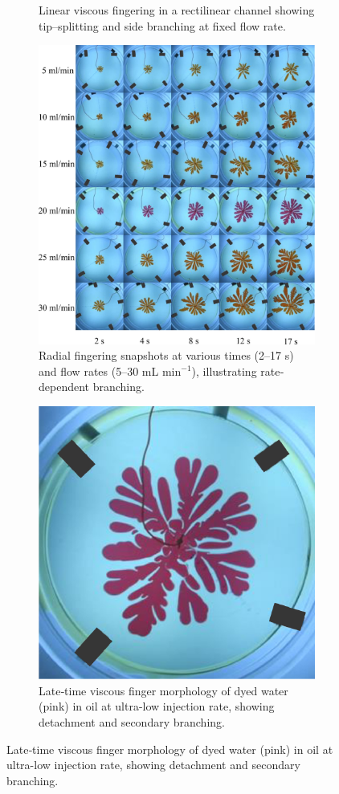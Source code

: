 \documentclass[12pt,a4paper]{article}
\begin{document}
\begin{figure}[H]
\begin{subfigure}{0.45\linewidth}
    \caption{Linear viscous fingering in a rectilinear channel showing tip–splitting and side branching at fixed flow rate.}
  \end{subfigure}

  \begin{subfigure}{0.45\linewidth}
    \includegraphics[width=0.9\linewidth]{raates-sft-004.jpg}
\caption{Radial fingering snapshots at various times (2–17 s) and flow rates (5–30 mL \( \mathrm{min}^{-1} \)), illustrating rate‐dependent branching.}

  \end{subfigure}
  \hfill
  \begin{subfigure}{0.45\linewidth}
    \includegraphics[width=0.8\linewidth]{high-res-sft-003.jpg}
    \caption{Late‐time viscous finger morphology of dyed water (pink) in oil at ultra-low injection rate, showing detachment and secondary branching.}
  \end{subfigure}


\end{figure}
\end{document}

